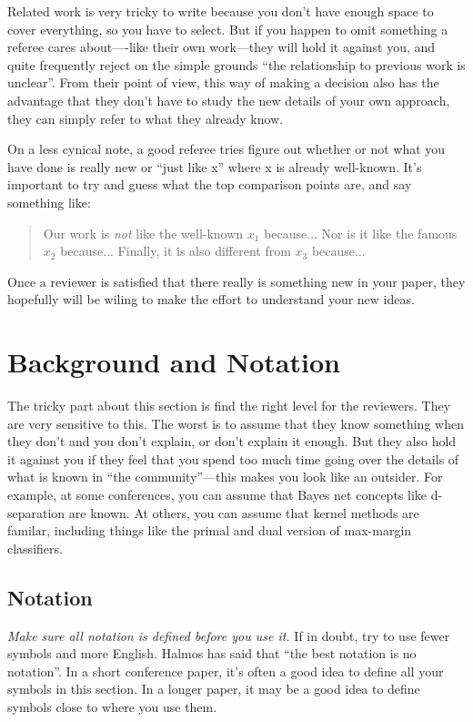 \documentclass{article}
\begin{document}
Related work is very tricky to write because you don't have enough space to cover everything, so you have to select. But if you happen to omit something a referee cares about----like their own work---they will hold it against you, and quite frequently reject on the simple grounds ``the relationship to previous work is unclear''. From their point of view, this way of making a decision also has the advantage that they don't have to study the new details of your own approach, they can simply refer to what they already know. 

On a less cynical note, a good referee tries figure out whether or not what you have done is really new or ``just like x'' where x is already well-known. It's important to try and guess what the top comparison points are, and say something like:

\begin{quote}
Our work is {\em not} like the well-known $x_{1}$ because... Nor is it like the famous $x_{2}$ because... Finally, it is also different from $x_{3}$ because... 
\end{quote}

Once a reviewer is satisfied that there really is something new in your paper, they hopefully will be wiling to make the effort to understand your new ideas.

\section{Background and Notation} 

The tricky part about this section is find the right level for the reviewers. They are very sensitive to this. The worst is to assume that they know something when they don't and you don't explain, or don't explain it enough. But they also hold it against you if they feel that you spend too much time going over the details of what is known in ``the community''---this makes you look like an outsider. For example, at some conferences, you can assume that Bayes net concepts like d-separation are known. At others, you can assume that kernel methods are familar, including things like the primal and dual version of max-margin classifiers. 

\subsection{Notation} {\em Make sure all notation is defined before you use it.} If in doubt, try to use fewer symbols and more English. Halmos has said that ``the best notation is no notation''. In a short conference paper, it's often a good idea to define all your symbols in this section. In a longer paper, it may be a good idea to define symbols close to where you use them.
\end{document}
